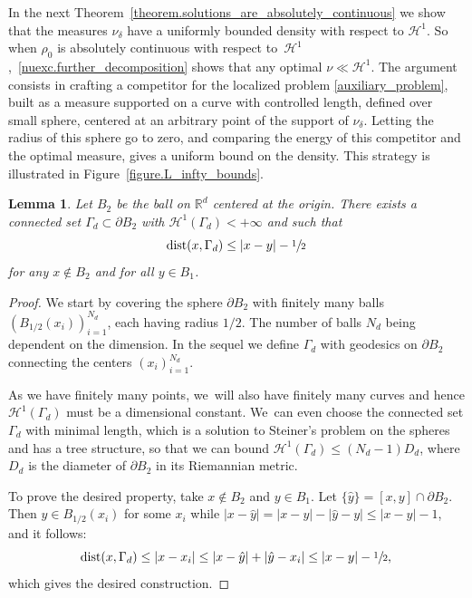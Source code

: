 \documentclass[11pt]{article}
\numberwithin{equation}{section}
\newtheorem{lemma}[theorem]{Lemma}
\theoremstyle{definition}
\newcommand\cH{\mathcal{H}}
\newcommand{\RR}{\mathbb{R}}
\DeclareMathOperator{\dist}{dist}
\begin{document}
In the next Theorem~\ref{theorem.solutions_are_absolutely_continuous} we show that the measures $\nu_\delta$ have a uniformly
bounded density with respect to $\cH^1$. So when $\rho_0$ is absolutely continuous with respect to~$\cH^1$,~\eqref{nuexc.further_decomposition}
shows that any optimal $\nu \ll \cH^1$.
The argument consists in crafting a competitor for the
localized problem \eqref{auxiliary_problem}, built as a measure supported on a curve with controlled length, defined over small sphere, centered at an arbitrary point of the support of $\nu_\delta$. Letting the radius of this sphere go to zero, and comparing the energy of this competitor and the optimal measure, gives a uniform bound on the density.
This strategy is illustrated in Figure~\ref{figure.L_infty_bounds}.

\begin{lemma}\label{lemma.curve_on_B2}
Let $B_2$ be the ball on $\RR^d$ centered at the origin. There exists a connected set $\Gamma_d \subset \partial B_2$ with $\cH^1(\Gamma_d) < +\infty$ and such that\vspace*{-3pt}
\[
\dist(x, \Gamma_d) \le |x - y| - \sfrac{1}{2}
\]
for any $x \not\in B_2$ and for all $y \in B_1$.
\end{lemma}

\begin{proof}
We start by covering the sphere $\partial B_2$ with finitely many balls $\left(B_{1/2}(x_i)\right)_{i = 1}^{N_d}$, each having radius $1/2$. The number of balls $N_d$ being dependent on the dimension. In the sequel we define $\Gamma_d$ with geodesics on $\partial B_2$ connecting the centers $\left(x_i\right)_{i = 1}^{N_d}$.

As we have finitely many points, we~will also have finitely many curves and hence $\cH^1(\Gamma_d)$ must be a dimensional constant. We~can even choose the connected set $\Gamma_d$ with minimal length,
which is a solution to Steiner's problem on the spheres and has a tree structure,
so that we can bound $\cH^1(\Gamma_d) \le (N_d - 1)D_d$, where $D_d$ is the diameter of $\partial B_2$ in its Riemannian metric.

To prove the desired property, take $x \not\in B_2$ and $y \in B_1$. Let $\{\hat y\} = [x,y]\cap \partial B_2$. Then $\hat y \in B_{1/2}(x_i)$ for some $x_i$
while $|x-\hat y|=|x-y|-|\hat y-y|\le |x-y|-1$, and it follows:
\[
\dist(x, \Gamma_d)
\le |x - x_i|
\le |x - \hat y| + |\hat y - x_i|
\le |x - y| - \sfrac{1}{2},
\]
which gives the desired construction.
\end{proof}
\end{document}
